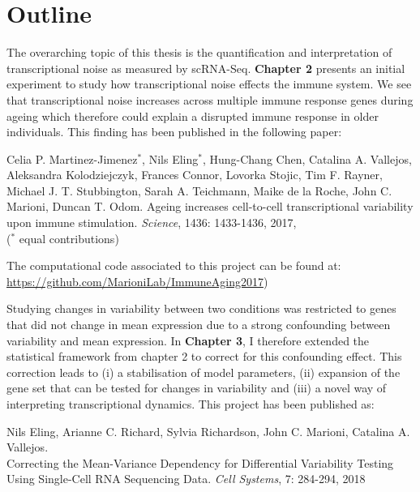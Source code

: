 

\section{Outline}

The overarching topic of this thesis is the quantification and interpretation of transcriptional noise as measured by scRNA-Seq. 
\textbf{Chapter 2} presents an initial experiment to study how  transcriptional noise effects the immune system. 
We see that transcriptional noise increases across multiple immune response genes during ageing which therefore could explain a disrupted immune response in older individuals. 
This finding has been published in the following paper:

\begin{Abstract}
\hspace{-5mm} Celia P. Martinez-Jimenez$^\ast$, Nils  Eling$^\ast$, Hung-Chang Chen, Catalina A. Vallejos, Aleksandra Kolodziejczyk, Frances Connor, Lovorka Stojic, Tim F. Rayner, Michael J. T. Stubbington, Sarah A. Teichmann, Maike de la Roche, John C. Marioni, Duncan T. Odom. 
Ageing increases cell-to-cell transcriptional variability upon immune stimulation. \emph{Science}, 1436: 1433-1436, 2017, \\
($^\ast$ equal contributions) 
\end{Abstract}

The computational code associated to this project can be found at:\\
\url{https://github.com/MarioniLab/ImmuneAging2017})

Studying changes in variability between two conditions was restricted to genes that did not change in mean expression due to a strong confounding between variability and mean expression. 
In \textbf{Chapter 3}, I therefore extended the statistical framework from chapter 2 to correct for this confounding effect. 
This correction leads to (i) a stabilisation of model parameters, (ii) expansion of the gene set that can be tested for changes in variability and (iii) a novel way of interpreting transcriptional dynamics. 
This project has been published as:

\begin{Abstract}
\hspace{-5mm} Nils Eling, Arianne C. Richard, Sylvia Richardson, John C. Marioni, Catalina A. Vallejos. \\
Correcting the Mean-Variance Dependency for Differential Variability Testing Using Single-Cell RNA Sequencing Data. \emph{Cell Systems}, 7: 284-294, 2018
\end{Abstract}

